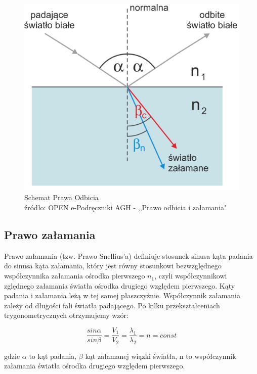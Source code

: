 \documentclass[a4paper,12pts]{article}
\begin{document}
	\begin{figure}[!h]
		\centering
		\includegraphics[scale=0.3]{odbicie.png}
 		\caption{Schemat Prawa Odbicia \\ źródło: OPEN e-Podręczniki AGH - ,,Prawo odbicia i załamania"}
		\label{odbicie}
	\end{figure}
	
	\subsection{Prawo załamania}
	
	Prawo załamania (tzw. Prawo Snellius'a) definiuje stosunek sinusa kąta padania do sinusa kąta załamania, który jest równy stosunkowi bezwzględnego współczynnika załamania ośrodka pierwszego $n_1$, czyli współczynnikowi zględnego załamania światła ośrodka drugiego względem pierwszego. Kąty padania i załamania leżą w tej samej płaszczyźnie. Współczynnik załamania zależy od długości fali światła padającego. Po kilku przekształceniach trygonometrycznych otrzymujemy wzór:
	
	\begin{equation}
		\frac{sin\alpha}{sin\beta} = \frac{V_1}{V_2} = \frac{\lambda_1}{\lambda_2} = n = const
	\end{equation} 

	gdzie $\alpha$ to kąt padania, $\beta$ kąt załamanej wiązki światła, n to współczynnik załamania światła ośrodka drugiego względem pierwszego.
\end{document}
